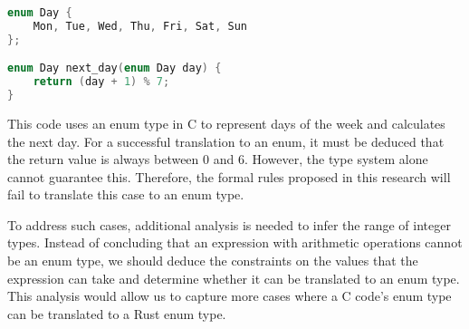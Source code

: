 \documentclass[10pt,conference]{IEEEtran}
\begin{document}
\begin{lstlisting}[language=C]
enum Day {
    Mon, Tue, Wed, Thu, Fri, Sat, Sun
};

enum Day next_day(enum Day day) {
    return (day + 1) % 7;
}
\end{lstlisting}


This code uses an enum type in C to represent days of the week and calculates the next day. For a successful translation to an enum, it must be deduced that the return value is always between 0 and 6. However, the type system alone cannot guarantee this. Therefore, the formal rules proposed in this research will fail to translate this case to an enum type.


To address such cases, additional analysis is needed to infer the range of integer types. Instead of concluding that an expression with arithmetic operations cannot be an enum type, we should deduce the constraints on the values that the expression can take and determine whether it can be translated to an enum type. This analysis would allow us to capture more cases where a C code's enum type can be translated to a Rust enum type.
\end{document}
